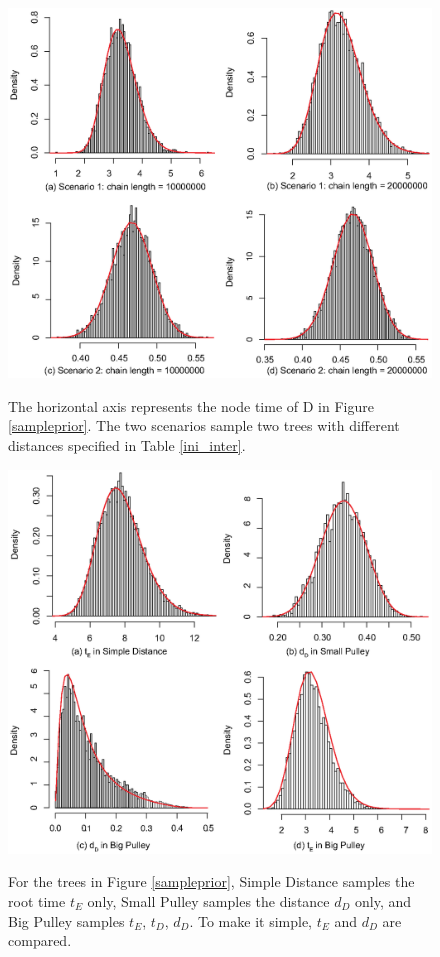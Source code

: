 \documentclass{bmcart}
\begin{document}
\begin{backmatter}
\begin{figure}[h!]
\includegraphics[width=12cm]{Fig14-testinternalnode.eps}\\
\caption{ 
             The horizontal axis represents the node time of D in Figure \ref{sampleprior}. The two scenarios sample two trees with different distances specified in Table \ref{ini_inter}.}
\label{res_int}
\end{figure}

\begin{figure}[h!]
\includegraphics[width=12cm]{Fig15-testroot.eps}\\
\caption{
             For the trees in Figure \ref{sampleprior}, Simple Distance samples the root time $t_E$ only, Small Pulley samples the distance $d_D$ only, and Big Pulley samples $t_E$, $t_D$, $d_D$. To make it simple, $t_E$ and $d_D$ are compared.}
\label{res_roo1}
\end{figure}


\end{backmatter}
\end{document}
